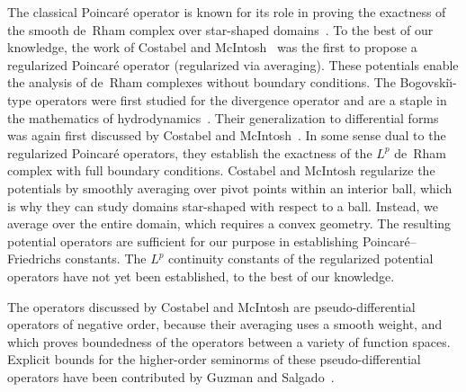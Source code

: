 \documentclass[10pt,a4paper]{article}
\newcommand{\mwl}[1]{{\color{red}#1}}
\begin{document}


\begin{remark} \label{remark:reg_Poinc_Bog}
    The classical Poincar\'e operator is known for its role in proving the exactness of the smooth de~Rham complex over star-shaped domains~\cite{lee2012smooth}.
    To the best of our knowledge, the work of Costabel and McIntosh~\cite{costabel2010bogovskiui} was the first to propose a regularized Poincar\'e operator (regularized via averaging).
    These potentials enable the analysis of de~Rham complexes without boundary conditions.
    The Bogovski\u{\i}-type operators were first studied for the divergence operator and are a staple in the mathematics of hydrodynamics~\cite{bogovskii1979solution}.
    Their generalization to differential forms was again first discussed by Costabel and McIntosh~\cite{costabel2010bogovskiui}. 
    In some sense dual to the regularized Poincar\'e operators, they establish the exactness of the $L^{p}$ de~Rham complex with full boundary conditions.
    Costabel and McIntosh regularize the potentials by smoothly averaging over pivot points within an interior ball, 
    which is why they can study domains star-shaped with respect to a ball. 
    Instead, we average over the entire domain, which requires a convex geometry. 
    The resulting potential operators are sufficient for our purpose in establishing Poincar\'e--Friedrichs constants. 
    The $L^{p}$ continuity constants of the regularized potential operators have not yet been established, to the best of our knowledge.
    
    The operators discussed by Costabel and McIntosh are pseudo-differential operators of negative order, 
    because their averaging uses a smooth weight, and which proves boundedness of the operators between a variety of function spaces. 
    Explicit bounds for the higher-order seminorms of these pseudo-differential operators 
    have been contributed by Guzman and Salgado~\cite{guzman2021estimation}. %
    

\end{remark}
\end{document}
